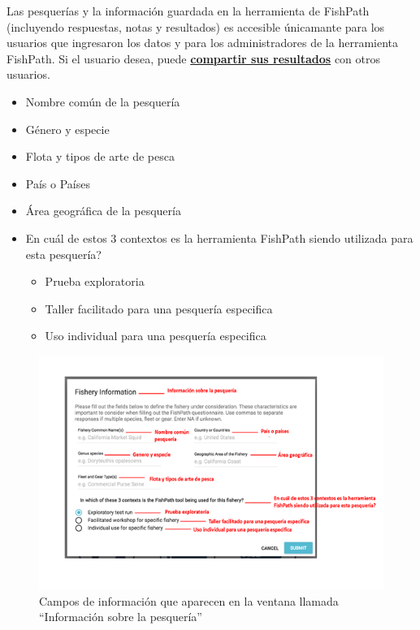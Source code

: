 \documentclass[
  11pt,
]{book}
\providecommand{\tightlist}{%
  \setlength{\itemsep}{0pt}\setlength{\parskip}{0pt}}
\begin{document}
Las pesquerías y la información guardada en la herramienta de FishPath (incluyendo respuestas, notas y resultados) es accesible únicamante para los usuarios que ingresaron los datos y para los administradores de la herramienta FishPath. Si el usuario desea, puede \protect\hyperlink{Results-Actions}{\textbf{compartir sus resultados}} con otros usuarios.

\begin{itemize}
\tightlist
\item
  Nombre común de la pesquería
\item
  Género y especie
\item
  Flota y tipos de arte de pesca
\item
  País o Países
\item
  Área geográfica de la pesquería
\item
  En cuál de estos 3 contextos es la herramienta FishPath siendo utilizada para esta pesquería?

  \begin{itemize}
  \tightlist
  \item
    Prueba exploratoria\\
  \item
    Taller facilitado para una pesquería especifica
  \item
    Uso individual para una pesquería especifica
  \end{itemize}
\end{itemize}

\begin{figure}

{\centering \includegraphics[width=0.95\linewidth]{images/fishery-info-screen-es} 

}

\caption{Campos de información que aparecen en la ventana llamada “Información sobre la pesquería”}\label{fig:fishery-info}
\end{figure}
\end{document}
